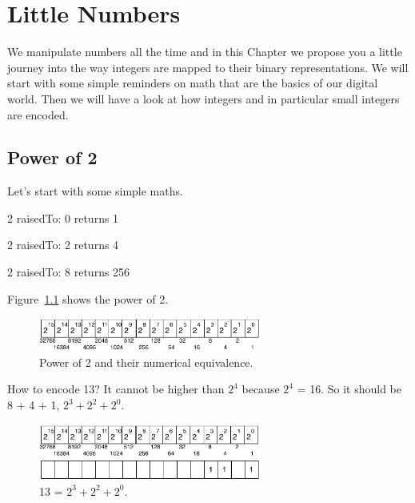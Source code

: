 \documentclass[a4paper,10pt,twoside]{book}
\begin{document}
\fi
\sloppy

\chapter{Little Numbers}

We manipulate numbers all the time and in this Chapter we propose you a little journey into the way 
integers are mapped to their binary representations. We will start with some simple reminders on math that are the basics of our digital world. Then we will have a look at how integers and in particular small integers are encoded.

\section{Power of 2}

Let's start with some simple maths. 


\begin{code}{}
2 raisedTo: 0
	returns 1

2 raisedTo: 2
	returns 4
	
2 raisedTo: 8
	returns 256
\end{code}

Figure~\ref{power} shows the power of 2. 
\begin{figure}[h]
\begin{center}
\includegraphics[width=0.65\textwidth]{16bits-number}
\caption{Power of 2 and their numerical equivalence.\label{power}}
\end{center}
\end{figure}

How to encode 13? It cannot be higher than $2^{4}$ because $2^{4}$ = 16. So it should be 8 + 4 + 1, $2^{3} + 2^{2} + 2^{0}$.

\begin{figure}[h]
\begin{center}
\includegraphics[width=0.65\textwidth]{16bits-number13}
\caption{13 = $2^{3} + 2^{2} + 2^{0}$.}
\end{center}
\end{figure}
\end{document}
